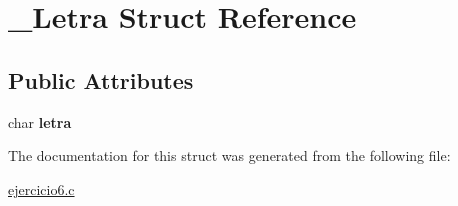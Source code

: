 \hypertarget{struct___letra}{}\section{\+\_\+\+Letra Struct Reference}
\label{struct___letra}
\subsection*{Public Attributes}
\begin{DoxyCompactItemize}
\item 
\mbox{\label{struct___letra_a4282367c77385e557b022b81cb4a5c05}} 
char {\bfseries letra}
\end{DoxyCompactItemize}


The documentation for this struct was generated from the following file\+:\begin{DoxyCompactItemize}
\item 
\hyperlink{ejercicio6_8c}{ejercicio6.\+c}\end{DoxyCompactItemize}
